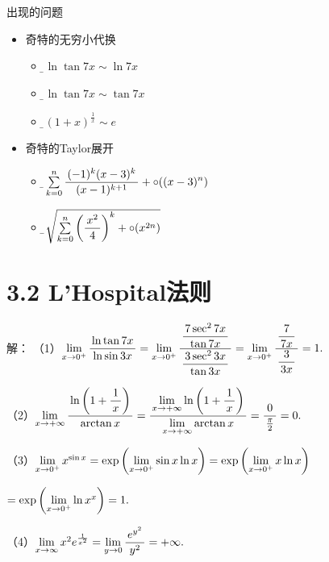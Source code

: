 \begin{frame}{出现的问题}
	\linespread{1.5}
	  \begin{itemize}%
	    \item 奇特的无穷小代换
	    \begin{itemize}
	      \item \it\b $\ln\tan7x\sim\ln7x$
	      \item \it\b $\ln\tan7x\sim\tan7x$
	      \item \it\b $(1+x)^{\frac1x}\sim e$
	    \end{itemize}
	    \item 奇特的Taylor展开
	    \begin{itemize}
	      \item \it \b$\sum\limits_{k=0}^n
	      \displaystyle\frac{\,{(-1)^k(x-3)^k}\,}{\,{(x-1)^{k+1}}\,}+\circ((x-3)^n)$
	      \item \b $\sqrt{\sum\limits_{k=0}^n\left(\displaystyle\frac{\,{x^2}\,}{\,{4}\,}\right)^k
	      +\circ(x^{2n})}$
	    \end{itemize}
	  \end{itemize}
\end{frame}

\section{3.2 L'Hospital法则}

\begin{frame}
	\linespread{1.5}
	\pause
	
	
	\small 解：
	（1）$\lim\limits_{x\to{0^+}}\displaystyle\frac{\,{\ln\tan 7x}\,}{\,{\ln\sin 3x}\,}=\lim\limits_{x\to{0^+}}\displaystyle\frac{\,{\displaystyle\frac{\,{7\sec^27x}\,}{\,{\tan7x}\,}}\,}{\,{\displaystyle\frac{\,{3\sec^23x}\,}{\,{\tan3x}\,}}\,}
	=\lim\limits_{x\to{0^+}}\displaystyle\frac{\,{\displaystyle\frac{\,{7}\,}{\,{7x}\,}}\,}{\,{\displaystyle\frac{\,{3}\,}{\,{3x}\,}}\,}=1.$
	
	\pause	
	（2）$\lim\limits_{x\to{+\infty}}\displaystyle\frac{\,{\ln\left(1+\displaystyle\frac{\,{1}\,}{\,{x}\,}\right)}\,}{\,{\arctan x}\,}
	=\displaystyle\frac{\,{\lim\limits_{x\to{+\infty}}\ln\left(1+\displaystyle\frac{\,{1}\,}{\,{x}\,}\right)}\,}{\,{\lim\limits_{x\to{+\infty}}\arctan
	x}\,}=\displaystyle\frac{\,{0}\,}{\,{\frac{\pi}2}\,}=0.$
	
	
	\pause	
	（3）$\lim\limits_{x\to{0^+}}x^{\sin x}=\exp\left(\lim\limits_{x\to{0^+}}\sin x\ln x\right)
	=\exp\left(\lim\limits_{x\to{0^+}}x\ln x\right)$
	
	\quad$=\exp\left(\lim\limits_{x\to{0^+}}\ln x^x\right)
	=1.$
	
	\pause
	（4）$\lim\limits_{x\to{\infty}}x^2e^{\frac1{x^2}}
	=\lim\limits_{y\to0}\displaystyle\frac{\,{e^{y^2}}\,}{\,{y^2}\,}
	=+\infty.$

\end{frame}


